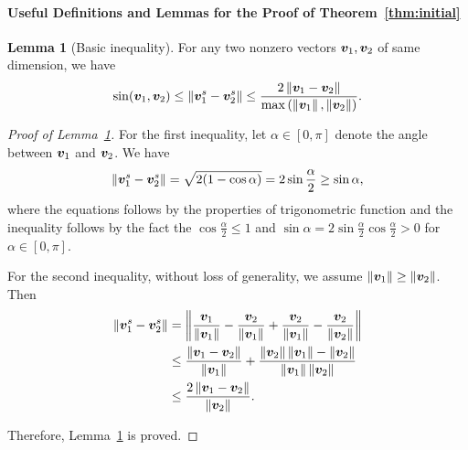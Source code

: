 \documentclass[lettersize,onecolumn,journal]{IEEEtran}
\theoremstyle{definition}
\newtheorem{lem}{Lemma}
\theoremstyle{definition}
\begin{document}
\paragraph{Useful Definitions and Lemmas for the Proof of Theorem~\ref{thm:initial}} 
\begin{lem}[Basic inequality]\label{lem:norm_diff} For any two nonzero vectors $\bm{v}_1,\bm{v}_2$ of same dimension, we have 
\[
\sin(\bm{v}_1 , \bm{v}_2) \leq \left\lVert{\bm{v}_1^s}-{\bm{v}_2^s}\right\rVert\leq {2\left\lVert\bm{v}_1-\bm{v}_2\right\rVert\over \max\left(\left\lVert\bm{v}_1\right\rVert,\left\lVert\bm{v}_2\right\rVert\right)}.
\]
\end{lem}
\begin{proof}[Proof of Lemma~\ref{lem:norm_diff}]
For the first inequality, let $\alpha \in [0,\pi]$ denote the angle between $\bm{v}_1$ and $\bm{v}_2$. We have 
\begin{align}
     \left\lVert{\bm{v}_1^s}-{\bm{v}_2^s}\right\rVert = \sqrt{2(1 - \cos \alpha)} = 2 \sin \frac{\alpha}{2} \geq \sin \alpha,
\end{align}
where the equations follows by the properties of trigonometric function and the inequality follows by the fact the $\cos \frac{\alpha}{2} \leq 1$ and $\sin \alpha = 2 \sin \frac{\alpha}{2} \cos \frac{\alpha}{2} > 0$ for $\alpha \in [0, \pi]$. 

For the second inequality, without loss of generality, we assume $\left\lVert\bm{v}_1\right\rVert\geq \left\lVert\bm{v}_2\right\rVert$. Then
\begin{align}
\left\lVert{\bm{v}_1^s}-{\bm{v}_2^s}\right\rVert&=\left\lVert{\bm{v}_1\over \left\lVert\bm{v}_1\right\rVert}- {\bm{v}_2\over \left\lVert\bm{v}_1\right\rVert}+{\bm{v}_2\over \left\lVert\bm{v}_1\right\rVert}-{\bm{v}_2\over \left\lVert\bm{v}_2\right\rVert}\right\rVert\\
&\leq {\left\lVert\bm{v}_1-\bm{v}_2\right\rVert\over \left\lVert\bm{v}_1\right\rVert}+{\left\lVert\bm{v}_2\right\rVert\left\lVert\bm{v}_1\right\rVert-\left\lVert\bm{v}_2\right\rVert\over \left\lVert\bm{v}_1\right\rVert\left\lVert\bm{v}_2\right\rVert}\\
&\leq {2\left\lVert\bm{v}_1-\bm{v}_2\right\rVert\over \left\lVert\bm{v}_2\right\rVert}.
\end{align}

Therefore, Lemma~\ref{lem:norm_diff} is proved.
\end{proof}
\end{document}

